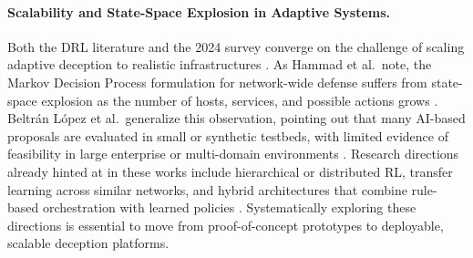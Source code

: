 \paragraph{Scalability and State-Space Explosion in Adaptive Systems.}
Both the DRL literature and the 2024 survey converge on the challenge of scaling adaptive deception to realistic
infrastructures \cite{hammad2024deep,deceptiontrends2024}. As Hammad et al.\ note, the Markov Decision Process
formulation for network-wide defense suffers from state-space explosion as the number of hosts, services, and
possible actions grows \cite{hammad2024deep}. Beltrán López et al.\ generalize this observation, pointing out
that many AI-based proposals are evaluated in small or synthetic testbeds, with limited evidence of feasibility
in large enterprise or multi-domain environments \cite{deceptiontrends2024}. Research directions already hinted
at in these works include hierarchical or distributed RL, transfer learning across similar networks, and hybrid
architectures that combine rule-based orchestration with learned policies \cite{hammad2024deep,deceptiontrends2024}.
Systematically exploring these directions is essential to move from proof-of-concept prototypes to deployable,
scalable deception platforms.
